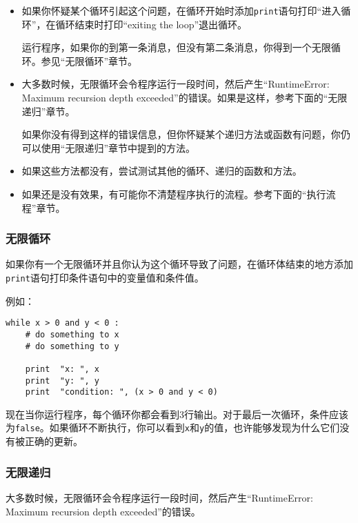 \begin{itemize}

\item 如果你怀疑某个循环引起这个问题，在循环开始时添加{\tt print}语句打印“进入循环”，在循环结束时打印“exiting the loop”退出循环。

运行程序，如果你的到第一条消息，但没有第二条消息，你得到一个无限循环。参见“无限循环”章节。

\item 大多数时候，无限循环会令程序运行一段时间，然后产生“RuntimeError: Maximum recursion depth exceeded”的错误。如果是这样，参考下面的“无限递归”章节。

如果你没有得到这样的错误信息，但你怀疑某个递归方法或函数有问题，你仍可以使用“无限递归”章节中提到的方法。

\item 如果这些方法都没有，尝试测试其他的循环、递归的函数和方法。

\item 如果还是没有效果，有可能你不清楚程序执行的流程。参考下面的“执行流程”章节。

\end{itemize}


\subsubsection{无限循环}

如果你有一个无限循环并且你认为这个循环导致了问题，在循环体结束的地方添加{\tt print}语句打印条件语句中的变量值和条件值。

例如：

\beforeverb
\begin{verbatim}
while x > 0 and y < 0 :
    # do something to x
    # do something to y

    print  "x: ", x
    print  "y: ", y
    print  "condition: ", (x > 0 and y < 0)
\end{verbatim}
\afterverb
%
现在当你运行程序，每个循环你都会看到3行输出。对于最后一次循环，条件应该为{\tt false}。如果循环不断执行，你可以看到{\tt x}和{\tt y}的值，也许能够发现为什么它们没有被正确的更新。


\subsubsection{无限递归}

大多数时候，无限循环会令程序运行一段时间，然后产生“RuntimeError: Maximum recursion depth exceeded”的错误。

